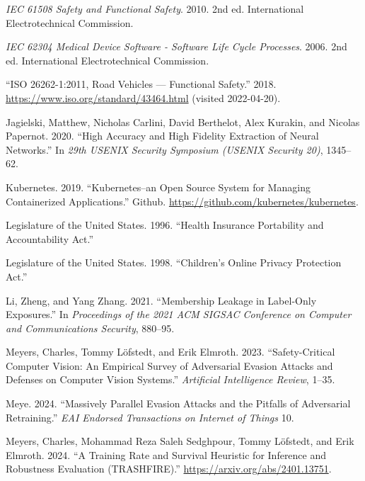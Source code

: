 \documentclass[
]{article}
\newlength{\cslhangindent}
\newlength{\cslentryspacingunit} %
\newenvironment{CSLReferences}[2] %
 {%
  \setlength{\parindent}{0pt}
  \ifodd #1
  \let\oldpar\par
  \def\par{\hangindent=\cslhangindent\oldpar}
  \fi
  \setlength{\parskip}{#2\cslentryspacingunit}
 }%
 {}
\begin{document}
\begin{CSLReferences}{1}{0}
\leavevmode{}%
\emph{IEC 61508 Safety and Functional Safety}. 2010. 2nd ed.
International Electrotechnical Commission.

\leavevmode{}%
\emph{IEC 62304 Medical Device Software - Software Life Cycle
Processes}. 2006. 2nd ed. International Electrotechnical Commission.

\leavevmode{}%
{``{ISO} 26262-1:2011, Road Vehicles --- Functional Safety.''} 2018.
\url{https://www.iso.org/standard/43464.html} (visited 2022-04-20).

\leavevmode{}%
Jagielski, Matthew, Nicholas Carlini, David Berthelot, Alex Kurakin, and
Nicolas Papernot. 2020. {``High Accuracy and High Fidelity Extraction of
Neural Networks.''} In \emph{29th USENIX Security Symposium (USENIX
Security 20)}, 1345--62.

\leavevmode{}%
Kubernetes. 2019. {``Kubernetes--an Open Source System for Managing
Containerized Applications.''} Github.
\url{https://github.com/kubernetes/kubernetes}.

\leavevmode{}%
Legislature of the United States. 1996. {``Health Insurance Portability
and Accountability Act.''}

\leavevmode{}%
Legislature of the United States. 1998. {``Children's Online Privacy Protection Act.''}

\leavevmode{}%
Li, Zheng, and Yang Zhang. 2021. {``Membership Leakage in Label-Only
Exposures.''} In \emph{Proceedings of the 2021 ACM SIGSAC Conference on
Computer and Communications Security}, 880--95.

\leavevmode{}%
Meyers, Charles, Tommy Löfstedt, and Erik Elmroth. 2023.
{``Safety-Critical Computer Vision: An Empirical Survey of Adversarial
Evasion Attacks and Defenses on Computer Vision Systems.''}
\emph{Artificial Intelligence Review}, 1--35.

\leavevmode{}%
Meye. 2024. {``Massively Parallel Evasion Attacks and the Pitfalls
of Adversarial Retraining.''} \emph{EAI Endorsed Transactions on
Internet of Things} 10.

\leavevmode{}%
Meyers, Charles, Mohammad Reza Saleh Sedghpour, Tommy Löfstedt, and Erik
Elmroth. 2024. {``A Training Rate and Survival Heuristic for Inference
and Robustness Evaluation (TRASHFIRE).''}
\url{https://arxiv.org/abs/2401.13751}.


\end{CSLReferences}
\end{document}
